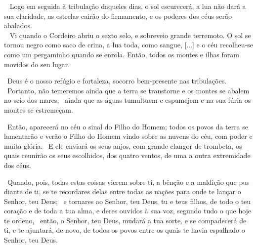 \documentclass[12pt,aspectratio=169]{beamer}
\newcommand{\ver}[1]{%
    \raisebox{0.50ex}{%
        \scalebox{1.1}{%
            \pmb{\textbf{\textcolor{BSpbg}{#1}}}%
        }%
    }%
}
\newcommand{\QUOTE}[1]{%
    \par\noindent\hspace*{0.1\linewidth}%
    \begin{minipage}{0.8\linewidth}%
        \linespread{1.35}\large{#1}%
    \end{minipage}%
}
\newcommand{\WIDEQUOTE}[1]{%
    \par\noindent\hspace*{0.02\linewidth}%
    \begin{minipage}{0.92\linewidth}%
        \linespread{1.25}\large{#1}%
    \end{minipage}%
}
\newcommand{\RED}[1]{{\textcolor{TXred}{#1}}}
\newcommand{\ORA}[1]{{\textcolor{TXora}{#1}}}
\newcommand{\YEL}[1]{{\textcolor{TXyel}{#1}}}
\newcommand{\GRE}[1]{{\textcolor{TXgre}{#1}}}
\newcommand{\CYA}[1]{{\textcolor{TXcya}{#1}}}
\newcommand{\BLU}[1]{{\textcolor{TXblu}{#1}}}
\newcommand{\MAG}[1]{{\textcolor{TXmag}{#1}}}
\newcommand{\BRI}[1]{{\textcolor{BSpbg}{#1}}}   %
\begin{document}
    \begin{frame}
        \WIDEQUOTE{%
            \ver{(ARA) Mt~24.29}~%
            Logo em seguida à tribulação daqueles dias, o \YEL{sol escurecerá},  a  \RED{lua
            não dará a  sua  claridade},  as  \GRE{estrelas  cairão  do  firmamento},  e  os
            \CYA{poderes dos céus serão abalados}. \\[\bigskipamount]
            \ver{(ARA) Ap~6.12,14}~%
            Vi  quando  o  Cordeiro  abriu  o  \BLU{sexto  selo},  e  sobreveio  \MAG{grande
            terremoto}. O \YEL{sol se tornou negro} como saco de  crina,  a  \RED{lua  toda,
            como sangue}, [...] e o  \CYA{céu  recolheu-se  como  um  pergaminho  quando  se
            enrola}. Então, todos os \MAG{montes e ilhas foram movidos do seu lugar}.
        }
    \end{frame}

    \begin{frame}
        \QUOTE{%
            \ver{(ARA) Sl~46.1}~Deus é o nosso refúgio e fortaleza, socorro bem-presente nas
            \RED{tribulações}. \ver{2}~Portanto, não temeremos ainda  que  a  \ORA{terra  se
            transtorne} e os \YEL{montes se abalem no seio dos mares}; \ver{3}~ainda que  as
            \GRE{águas tumultuem e espumejem} e na sua fúria os \YEL{montes se estremeçam}.
        }
    \end{frame}

    \begin{frame}
        \QUOTE{%
            \ver{(ARA) Mt~24.30}~Então, aparecerá no céu o \YEL{sinal do  Filho  do  Homem};
            todos os povos da terra se lamentarão e  \GRE{verão  o  Filho  do  Homem}  vindo
            \CYA{sobre as nuvens do céu}, com \MAG{poder e  muita  glória}.  \ver{31}~E  ele
            enviará os seus \YEL{anjos}, com grande clangor de trombeta, os  quais  reunirão
            os seus \BLU{es}\BRI{co}\BLU{lhi}\BRI{dos}, dos quatro  ventos,  \GRE{de  uma  a
            outra extremidade dos céus}.
        }
    \end{frame}

    \begin{frame}
        \WIDEQUOTE{%
            \ver{(ARA) Dt~30.1}~Quando, pois, todas estas coisas vierem sobre ti, a bênção e a
            maldição que pus diante de ti, se te recordares delas entre todas as nações para
            onde te lançar o Senhor, teu Deus; \ver{2}~e tornares ao Senhor, teu Deus, tu e teus
            filhos, de todo o teu coração e de toda a tua alma, e deres ouvidos à sua voz,
            segundo tudo o que hoje te ordeno, \ver{3}~então, o Senhor, teu Deus, mudará a tua
            sorte, e se compadecerá de ti, e te ajuntará, de novo, de todos os povos entre os
            quais te havia espalhado o Senhor, teu Deus.
        }
    \end{frame}
\end{document}
